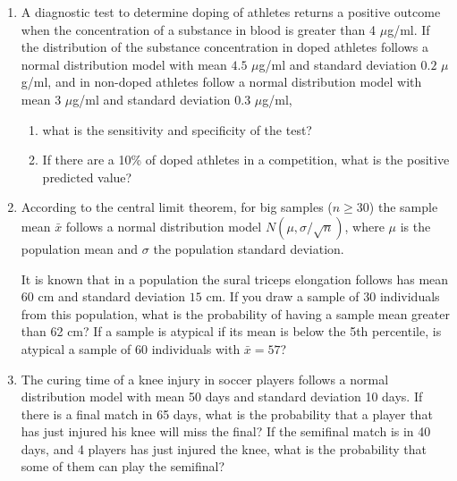 \begin{enumerate}[leftmargin=*,resume]
\item A diagnostic test to determine doping of athletes returns a positive outcome when the concentration of a substance
in blood is greater than 4 $\mu$g/ml.
If the distribution of the substance concentration in doped athletes follows a normal distribution model with mean $4.5$
$\mu$g/ml and standard deviation $0.2$ $\mu$g/ml, and in non-doped athletes follow a normal distribution model with mean
$3$ $\mu$g/ml and standard deviation $0.3$ $\mu$g/ml, 
\begin{enumerate}
\item what is the sensitivity and specificity of the test?
\item If there are a 10\% of doped athletes in a competition, what is the positive predicted value? 
\end{enumerate}

\item According to the central limit theorem, for big samples ($n\geq 30$) the sample mean $\bar x$ follows a normal
distribution model $N(\mu,\sigma/\sqrt{n})$, where $\mu$ is the population mean and $\sigma$ the population standard
deviation.

It is known that in a population the sural triceps elongation follows has mean $60$ cm and standard deviation $15$ cm. 
If you draw a sample of 30 individuals from this population, what is the probability of having a sample mean greater
than 62 cm?
If a sample is atypical if its mean is below the 5th percentile, is atypical a sample of 60 individuals with $\bar
x=57$?

\item The curing time of a knee injury in soccer players follows a normal distribution model with mean 50 days and
standard deviation 10 days.
If there is a final match in 65 days, what is the probability that a player that has just injured his knee will miss the
final?
If the semifinal match is in 40 days, and 4 players has just injured the knee, what is the probability that some of them
can play the semifinal?
\end{enumerate}